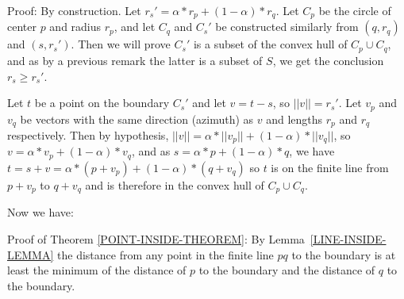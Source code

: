 \documentclass[12pt]{article}
\begin{document}
\begin{indpar}{0.2in}
Proof:  By construction.  Let $r_s'=\alpha*r_p+(1-\alpha)*r_q$.
Let $C_p$ be the circle of center $p$ and
radius $r_p$, and let $C_q$ and $C_s'$ be constructed similarly from
$(q,r_q)$ and $(s,r_s')$.  Then we will prove $C_s'$ is a subset of
the convex hull of $C_p\cup C_q$, and as by a previous remark
the latter is a subset of $S$, we get the conclusion $r_s\ge r_s'$.

Let $t$ be a point on the boundary $C_s'$ and let $v=t-s$, so
$||v||=r_s'$.  Let $v_p$ and $v_q$ be vectors
with the same direction (azimuth) as $v$ and lengths $r_p$ and $r_q$
respectively.  Then by hypothesis,
$||v|| = \alpha*||v_p||+(1-\alpha)*||v_q||$, so
$v = \alpha*v_p+(1-\alpha)*v_q$, and as
$s = \alpha*p+(1-\alpha)*q$, we have
$t=s+v=\alpha*(p+v_p)+(1-\alpha)*(q+v_q)$ so
$t$ is on the finite line from $p+v_p$ to $q+v_q$ and is therefore in the
convex hull of $C_p\cup C_q$.
\end{indpar}

Now we have:

\begin{indpar}{0.2in}
Proof of Theorem \ref{POINT-INSIDE-THEOREM}:
By Lemma~\ref{LINE-INSIDE-LEMMA} the distance from any point in
the finite line $pq$ to the boundary is at least the minimum
of the distance of $p$ to the boundary and the distance of $q$
to the boundary.
\end{indpar}



\newpage
\end{document}
